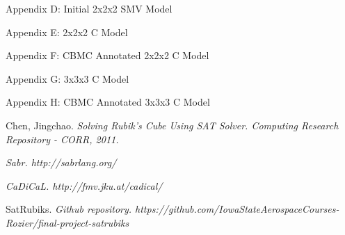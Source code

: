 \documentclass{article}
\begin{document}
\newpage

\begin{center}
Appendix D: Initial 2x2x2 SMV Model
\end{center}



\newpage

\begin{center}
Appendix E: 2x2x2 C Model
\end{center}



\newpage

\begin{center}
Appendix F: CBMC Annotated 2x2x2 C Model
\end{center}



\newpage

\begin{center}
Appendix G: 3x3x3 C Model
\end{center}



\newpage

\begin{center}
Appendix H: CBMC Annotated 3x3x3 C Model
\end{center}



\newpage

\begin{thebibliography}{9}
Chen, Jingchao. 
\textit{{Solving Rubik's Cube Using SAT Solver}. 
Computing Research Repository - CORR, 2011.}

\textit{{Sabr}. 
http://sabrlang.org/}

\textit{{CaDiCaL}. 
http://fmv.jku.at/cadical/}

SatRubiks.
\textit{{Github repository}.
https://github.com/IowaStateAerospaceCourses-Rozier/final-project-satrubiks}
\end{thebibliography}
\end{document}
